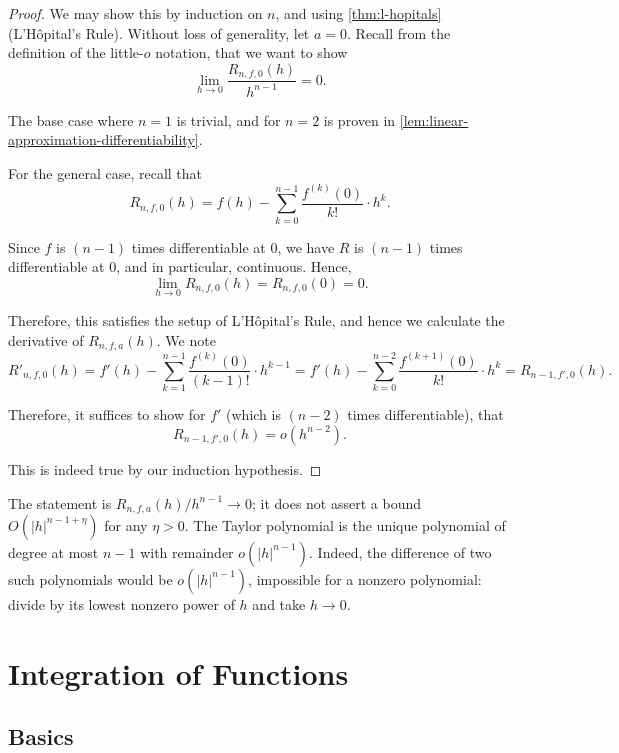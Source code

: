 \documentclass[11pt]{article}
\numberwithin{equation}{section}
\theoremstyle{definition}
\theoremstyle{remark}
\newcommand{\pqty}[1]{\left(#1\right)}
\newcommand{\littleO}{o}
\begin{document}
\begin{proof}
    We may show this by induction on \(n\), and using \autoref{thm:l-hopitals} (L'H\^{o}pital's Rule). Without loss of generality, let \(a = 0\). Recall from the definition of the little-\(\littleO\) notation, that we want to show
    \[
        \lim_{h \to 0} \frac{R_{n, f, 0} \pqty{h}}{h^{n - 1}} = 0.
    \]

    The base case where \(n = 1\) is trivial, and for \(n = 2\) is proven in \autoref{lem:linear-approximation-differentiability}.

    For the general case, recall that
    \[
        R_{n, f, 0} \pqty{h} = f\pqty{h} - \sum_{k = 0}^{n - 1} \frac{f^{\pqty{k}} \pqty{0}}{k!} \cdot h^k.
    \]

    Since \(f\) is \(\pqty{n - 1}\) times differentiable at \(0\), we have \(R\) is \(\pqty{n - 1}\) times differentiable at \(0\), and in particular, continuous. Hence,
    \[
        \lim_{h \to 0} R_{n, f, 0} \pqty{h} = R_{n, f, 0} \pqty{0} = 0.
    \]
    
    Therefore, this satisfies the setup of L'H\^{o}pital's Rule, and hence we calculate the derivative of \(R_{n, f, a} \pqty{h}\). We note
    \[
        R'_{n, f, 0} \pqty{h} = f'\pqty{h} - \sum_{k = 1}^{n - 1} \frac{f^{\pqty{k}} \pqty{0}}{\pqty{k - 1}!} \cdot h^{k - 1} = f'\pqty{h} - \sum_{k = 0}^{n - 2} \frac{f^{\pqty{k + 1}} \pqty{0}}{k!} \cdot h^k = R_{n - 1, f', 0} \pqty{h}.
    \]

    Therefore, it suffices to show for \(f'\) (which is \(\pqty{n - 2}\) times differentiable), that
    \[
        R_{n - 1, f', 0} \pqty{h} = \littleO\pqty{h^{n - 2}}.
    \]

    This is indeed true by our induction hypothesis.
\end{proof}

The statement is \(R_{n,f,a}(h)/h^{n-1}\to0\); it does not assert a bound
\(O(|h|^{n-1+\eta})\) for any \(\eta>0\).
The Taylor polynomial is the unique polynomial of degree at most \(n-1\)
with remainder \(o(|h|^{n-1})\). Indeed, the difference of two such polynomials
would be \(o(|h|^{n-1})\), impossible for a nonzero polynomial: divide by its
lowest nonzero power of \(h\) and take \(h\to0\).

\section{Integration of Functions}

\subsection{Basics}
\end{document}
